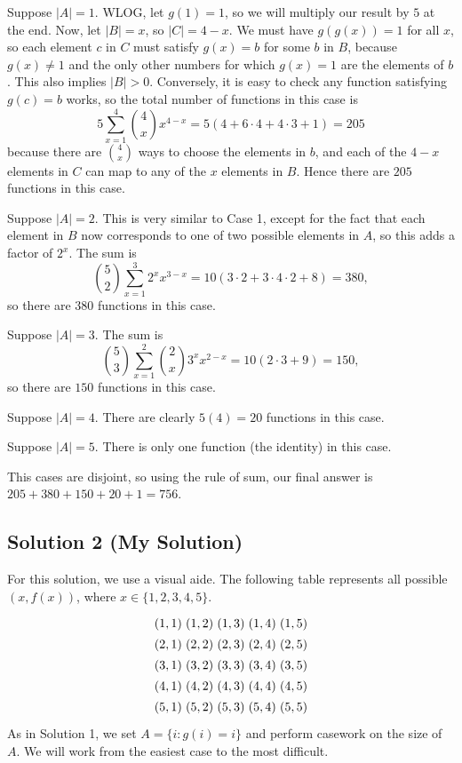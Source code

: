 \documentclass{article}
\begin{document}
    \begin{Cases}
        \item Suppose $|A| = 1$. WLOG, let $g(1) = 1$, so we will multiply our result by $5$ at the end. Now, let $|B| = x$, so $|C| = 4 - x$. We must have $g(g(x)) = 1$ for all $x$, so each element $c$ in $C$ must satisfy  $g(x) = b$ for some $b$ in $B$, because $g(x) \ne 1$ and the only other numbers for which $g(x) = 1$ are the elements of $b$. This also implies $|B| > 0$. Conversely, it is easy to check any function satisfying $g(c) = b$ works, so the total number of functions in this case is $$ 5 \sum_{x = 1}^{4} \binom{4}{x}x^{4 - x} = 5(4 + 6 \cdot 4 + 4 \cdot 3 + 1) = 205$$ because there are $\binom{4}{x}$ ways to choose the elements in $b$, and each of the $4 - x$ elements in $C$ can map to any of the $x$ elements in $B$. Hence there are $205$ functions in this case.
        \item Suppose $|A| = 2$. This is very similar to Case 1, except for the fact that each element in $B$ now corresponds to one of two possible elements in $A$, so this adds a factor of $2^{x}$. The sum is $$\binom{5}{2} \sum_{x = 1}^{3} 2^{x} x^{3 - x} = 10(3 \cdot 2 + 3 \cdot 4 \cdot 2 + 8) = 380,$$ so there are $380$ functions in this case.
        \item Suppose $|A| = 3$. The sum is $$\binom{5}{3} \sum_{x = 1}^{2} \binom{2}{x}3^{x}x^{2 - x} = 10(2 \cdot 3 + 9) = 150,$$ so there are $150$ functions in this case.
        \item Suppose $|A| = 4$. There are clearly $5(4) = 20$ functions in this case.
        \item Suppose $|A| = 5$. There is only one function (the identity) in this case.
    \end{Cases}
    This cases are disjoint, so using the rule of sum, our final answer is $205 + 380 + 150 + 20 + 1 = 756$.
    
\subsection*{Solution 2 (My Solution)}
    
    For this solution, we use a visual aide. The following table represents all possible $(x,f(x))$, where $x \in \{1, 2, 3, 4, 5\}$.
    $$
    \setlength{\arraycolsep}{1.5pt}
    \renewcommand{\arraystretch}{1.4}
    \begin{array}{ccccc}
        (1, 1) & (1, 2) & (1, 3) & (1, 4) & (1, 5) \\
        (2, 1) & (2, 2) & (2, 3) & (2, 4) & (2, 5) \\
        (3, 1) & (3, 2) & (3, 3) & (3, 4) & (3, 5) \\
        (4, 1) & (4, 2) & (4, 3) & (4, 4) & (4, 5) \\
        (5, 1) & (5, 2) & (5, 3) & (5, 4) & (5, 5)
    \end{array}$$
    As in Solution 1, we set $A = \{i : g(i) = i\}$ and perform casework on the size of $A$. We will work from the easiest case to the most difficult.
\end{document}
